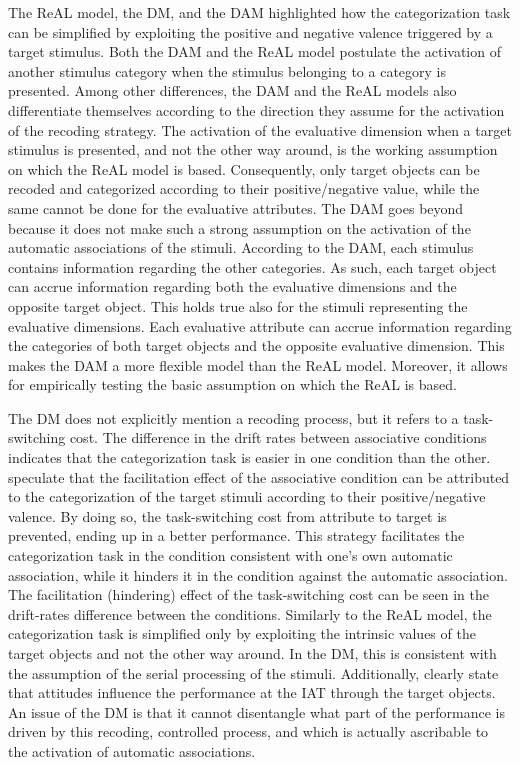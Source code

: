 \documentclass[12pt]{book}
\begin{document}
The ReAL model, the DM, and the DAM highlighted how the categorization task can be simplified by exploiting the positive and negative valence triggered by a target stimulus. 
Both the DAM and the ReAL model postulate the activation of another stimulus category when the stimulus belonging to a category is presented. 
Among other differences, the DAM and the ReAL models also differentiate themselves according to the direction they assume for the activation of the recoding strategy. 
The activation of the evaluative dimension when a target stimulus is presented, and not the other way around, is the working assumption on which the ReAL model is based. Consequently, only target objects  can be recoded and categorized according to their positive/negative value, while the same cannot be done for the evaluative attributes. 
The DAM goes beyond because it does not make such a strong assumption on the activation of the automatic associations of the stimuli. 
According to the DAM, each stimulus contains information regarding the other categories. As such, each target object can accrue information regarding both the evaluative dimensions and the opposite target object. This holds true also for the stimuli representing the evaluative dimensions. Each evaluative attribute can accrue information regarding the categories of both target objects and the opposite evaluative dimension. This makes the DAM a more flexible model than the ReAL model. Moreover, it allows for empirically testing the basic assumption on which the ReAL is based.

The DM does not explicitly mention a recoding process, but it refers to a task-switching cost. The difference in the drift rates between associative conditions indicates that the categorization task is easier in one condition than the other.  speculate that the facilitation effect of the associative condition can be attributed to the categorization of the target stimuli according to their positive/negative valence. By doing so, the task-switching cost from attribute to target is prevented, ending up in a better performance. This strategy facilitates the categorization task in the condition consistent with one's own automatic association, while it hinders it in the condition against the automatic association. 
The facilitation (hindering) effect of the task-switching cost can be seen in the  drift-rates difference between the conditions. 
Similarly to the ReAL model, the categorization task is simplified only by exploiting the intrinsic values of the target objects and not the other way around. In the DM, this is consistent with the assumption of the serial processing of the stimuli. Additionally,  clearly state that attitudes influence the performance at the IAT through the target objects. 
An issue of the DM is that it cannot disentangle what part of the performance is driven by this recoding, controlled process, and which is actually ascribable to the  activation of automatic associations.
\end{document}
